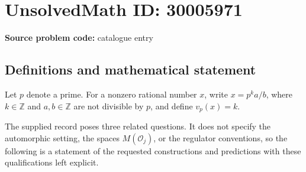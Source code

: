 \documentclass[11pt]{article}
\newcommand{\Z}{\mathbb{Z}}
\begin{document}
\section*{UnsolvedMath ID: 30005971}
\textbf{Source problem code:} catalogue entry
\subsection{Definitions and mathematical statement}
Let \(p\) denote a prime. For a nonzero rational number \(x\), write \(x=p^k a/b\), where \(k\in\Z\) and \(a,b\in\Z\) are not divisible by \(p\), and define \(v_p(x)=k\).

The supplied record poses three related questions. It does not specify the automorphic setting, the spaces \(M(\mathcal O_j)\), or the regulator conventions, so the following is a statement of the requested constructions and predictions with these qualifications left explicit.
\end{document}
